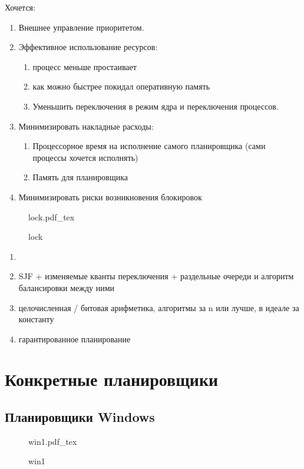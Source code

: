 \documentclass{book}
\theoremstyle{definition}
\newcommand{\incfig}[1]{%
    \def\svgwidth{\columnwidth}
    {#1.pdf_tex}
}
\begin{document}
Хочется:
\begin{enumerate}
    \item Внешнее управление приоритетом.
    \item Эффективное использование ресурсов:
        \begin{enumerate}
            \item процесс меньше простаивает
            \item как можно быстрее покидал оперативную память
            \item Уменьшить переключения в режим ядра и переключения процессов.
        \end{enumerate}
    \item Минимизировать накладные расходы:
        \begin{enumerate}
            \item Процессорное время на исполнение самого планировщика (сами процессы хочется исполнять)
            \item Память для планировщика
        \end{enumerate}
    \item Минимизировать риски возникновения блокировок
\end{enumerate}

\begin{figure}[!ht]
    \centering
    \incfig{lock}
    \caption{lock}
    \label{fig:lock}
\end{figure}

\begin{enumerate}
    \item 
    \item SJF + изменяемые кванты переключения + раздельные очереди и алгоритм балансировки между ними
    \item целочисленная / битовая арифметика, алгоритмы за n или лучше, в идеале за константу
    \item гарантированное планирование
\end{enumerate}

\section{Конкретные планировщики}

\subsection{Планировщики Windows}

\begin{figure}[!ht]
    \centering
    \incfig{win1}
    \caption{win1}
    \label{fig:win1}
\end{figure}
\end{document}

